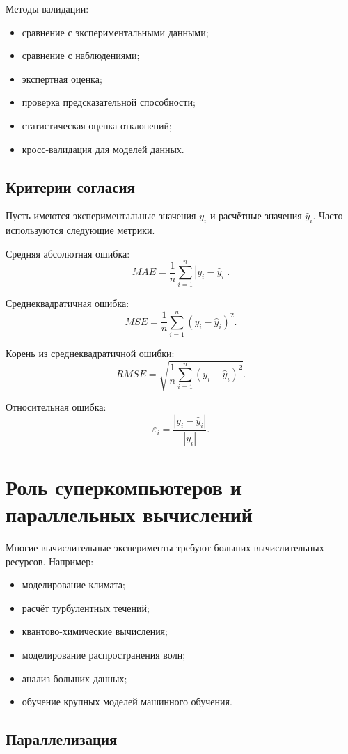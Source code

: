 \documentclass[12pt,a4paper]{article}
\theoremstyle{definition}
\theoremstyle{plain}
\begin{document}
Методы валидации:
\begin{itemize}
    \item сравнение с экспериментальными данными;
    \item сравнение с наблюдениями;
    \item экспертная оценка;
    \item проверка предсказательной способности;
    \item статистическая оценка отклонений;
    \item кросс-валидация для моделей данных.
\end{itemize}

\subsection{Критерии согласия}

Пусть имеются экспериментальные значения $y_i$ и расчётные значения $\widehat{y}_i$. Часто используются следующие метрики.

Средняя абсолютная ошибка:
\[
MAE
=
\frac1n\sum_{i=1}^n |y_i-\widehat{y}_i|.
\]

Среднеквадратичная ошибка:
\[
MSE
=
\frac1n\sum_{i=1}^n (y_i-\widehat{y}_i)^2.
\]

Корень из среднеквадратичной ошибки:
\[
RMSE
=
\sqrt{
\frac1n\sum_{i=1}^n (y_i-\widehat{y}_i)^2
}.
\]

Относительная ошибка:
\[
\varepsilon_i
=
\frac{|y_i-\widehat{y}_i|}{|y_i|}.
\]

\section{Роль суперкомпьютеров и параллельных вычислений}

Многие вычислительные эксперименты требуют больших вычислительных ресурсов. Например:
\begin{itemize}
    \item моделирование климата;
    \item расчёт турбулентных течений;
    \item квантово-химические вычисления;
    \item моделирование распространения волн;
    \item анализ больших данных;
    \item обучение крупных моделей машинного обучения.
\end{itemize}

\subsection{Параллелизация}
\end{document}

